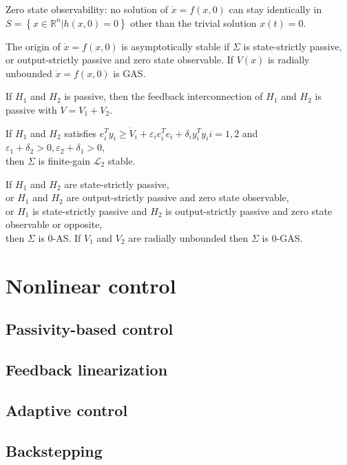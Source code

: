 \begin{definition}
    Zero state observability: no solution of $\dot{x}=f(x, 0)$ can stay identically in $S=\left\{x \in \mathbb{R}^{n} | h(x, 0)=0\right\}$ other than the trivial solution $x(t)=0$.
\end{definition}
\begin{lemma}
    The origin of $\dot{x}=f(x, 0)$ is asymptotically stable if $\Sigma$ is state-strictly passive, or output-strictly passive and zero state observable.
    If $V(x)$ is radially unbounded $\dot{x}=f(x, 0)$ is GAS.
\end{lemma}

\begin{theorem}
    If $H_1$ and $H_2$ is passive, then the feedback interconnection of $H_1$ and $H_2$ is passive with $V=V_1+V_2$.
\end{theorem}
\begin{theorem}
    If $H_1$ and $H_2$ satisfies $e_{i}^{T} y_{i} \geq \dot{V}_{i}+\varepsilon_{i} e_{i}^{T} e_{i}+\delta_{i} y_{i}^{T} y_{i} i=1,2$ and $\varepsilon_{1}+\delta_{2}>0, \varepsilon_{2}+\delta_{1}>0$, \\
    then $\Sigma$ is finite-gain $\mathscr{L}_{2}$ stable.
\end{theorem}
\begin{theorem}
    If $H_1$ and $H_2$ are state-strictly passive,\\
    or $H_1$ and $H_2$ are output-strictly passive and zero state observable,\\
    or $H_1$ is state-strictly passive and $H_2$ is output-strictly passive and zero state observable or opposite,\\
    then $\Sigma$ is 0-AS. If $V_1$ and $V_2$ are radially unbounded then $\Sigma$ is 0-GAS.
\end{theorem}

\section{Nonlinear control}
\subsection{Passivity-based control}
\subsection{Feedback linearization}
\subsection{Adaptive control}
\subsection{Backstepping}